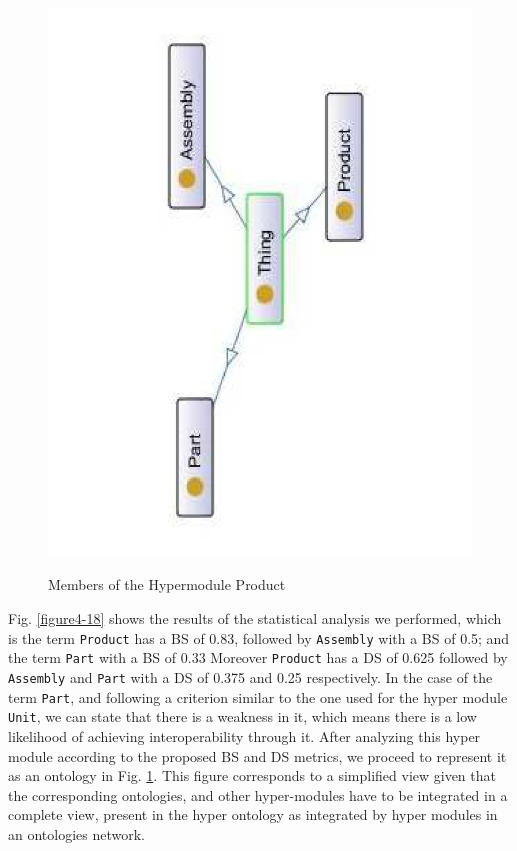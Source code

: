 \begin{figure}
\begin{center}
	\includegraphics[scale=0.5, angle=270]{figure-chapterIV/fig4-19}\\
	\vspace{-20}
	\caption{Members of the Hypermodule Product}
	\label{figure4-19}
\end{center}
\end{figure}


Fig. \ref{figure4-18} shows the results of the statistical analysis we performed, which is the term \texttt{Product} has a BS of 0.83, followed by \texttt{Assembly} with a BS of 0.5; and the term \texttt{Part} with a BS of 0.33 Moreover \texttt{Product} has a DS of 0.625 followed by \texttt{Assembly} and \texttt{Part} with a DS of 0.375 and 0.25 respectively. In the case of the term \texttt{Part}, and following a criterion similar to the one used for the hyper module \texttt{Unit}, we can state that there is a weakness in it, which means there is a low likelihood of achieving interoperability through it.  After analyzing  this hyper module according to the proposed BS and DS metrics, we proceed to represent it as an ontology in Fig. \ref{figure4-19}. This figure corresponds to a simplified view given that the corresponding ontologies, and other hyper-modules have to be integrated in a complete view, present in the hyper ontology as integrated by hyper modules in an ontologies network. 


